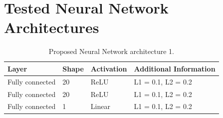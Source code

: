 \documentclass[12pt]{IEEEtran}%
\begin{document}
%
%

\clearpage


\appendix


\section*{Tested Neural Network Architectures}

\bigskip

\begin{table}[tbh]
\centering
\caption{Proposed Neural Network architecture 1.}%
\begin{tabular}
[c]{llll}\hline
Layer & Shape & Activation & Additional Information\\\hline\hline
Fully connected & 20 & ReLU & L1 = 0.1, L2 = 0.2\\
Fully connected & 20 & ReLU & L1 = 0.1, L2 = 0.2\\
Fully connected & 1 & Linear & L1 = 0.1, L2 = 0.2\\\hline
\end{tabular}
\label{table:proposed_nn_1}%
\end{table}
\end{document}
